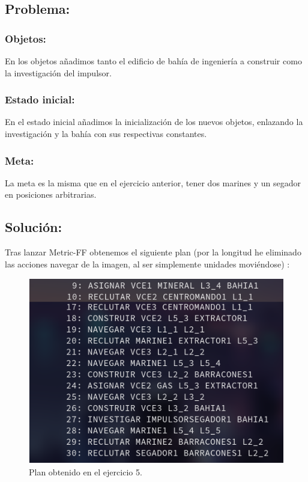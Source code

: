 \documentclass[10pt, spanish]{article}
\begin{document}
\subsection{Problema:}

\subsubsection{Objetos:}

En los objetos añadimos tanto el edificio de bahía de ingeniería a construir como la investigación del impulsor.

\subsubsection{Estado inicial:}

En el estado inicial añadimos la inicialización de los nuevos objetos, enlazando la investigación y la bahía con sus respectivas constantes.

\subsubsection{Meta:}

La meta es la misma que en el ejercicio anterior, tener dos marines y un segador en posiciones arbitrarias.

\subsection{Solución:}

\begin{multicols}{2}

Tras lanzar Metric-FF obtenemos el siguiente plan (por la longitud he eliminado las acciones navegar de la imagen, al ser simplemente unidades moviéndose)  :



\begin{figure}[H]
	\centering
	\vspace*{-1cm}\includegraphics[scale=0.2]{plan5.png}
	\caption{Plan obtenido en el ejercicio 5.}
	\label{plan5}
\end{figure}

\end{multicols}
\end{document}

